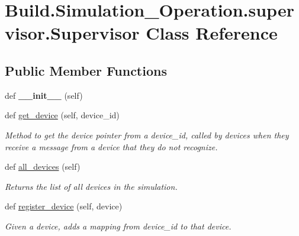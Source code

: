 \hypertarget{class_build_1_1_simulation___operation_1_1supervisor_1_1_supervisor}{}\section{Build.\+Simulation\+\_\+\+Operation.\+supervisor.\+Supervisor Class Reference}
\label{class_build_1_1_simulation___operation_1_1supervisor_1_1_supervisor}
\subsection*{Public Member Functions}
\begin{DoxyCompactItemize}
\item 
\mbox{\label{class_build_1_1_simulation___operation_1_1supervisor_1_1_supervisor_a2bff4b3eb3103c7dd32e95d11958f1e4}} 
def {\bfseries \+\_\+\+\_\+init\+\_\+\+\_\+} (self)
\item 
def \hyperlink{class_build_1_1_simulation___operation_1_1supervisor_1_1_supervisor_afbe9013693a4d24151e3063a6f05a13e}{get\+\_\+device} (self, device\+\_\+id)
\begin{DoxyCompactList}\small\item\em Method to get the device pointer from a device\+\_\+id, called by devices when they receive a message from a device that they do not recognize. \end{DoxyCompactList}\item 
\mbox{\label{class_build_1_1_simulation___operation_1_1supervisor_1_1_supervisor_a906a09a9bb5acf8b1a4ed4cda6d91661}} 
def \hyperlink{class_build_1_1_simulation___operation_1_1supervisor_1_1_supervisor_a906a09a9bb5acf8b1a4ed4cda6d91661}{all\+\_\+devices} (self)
\begin{DoxyCompactList}\small\item\em Returns the list of all devices in the simulation. \end{DoxyCompactList}\item 
def \hyperlink{class_build_1_1_simulation___operation_1_1supervisor_1_1_supervisor_a832a95fccf9b01f2a3126f554e172adb}{register\+\_\+device} (self, device)
\begin{DoxyCompactList}\small\item\em Given a device, adds a mapping from device\+\_\+id to that device. \end{DoxyCompactList}\item 

\end{DoxyCompactItemize}
